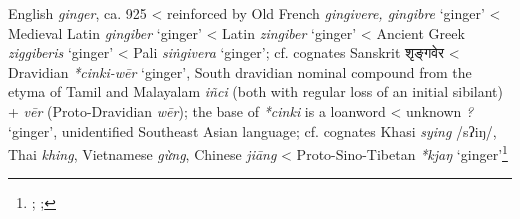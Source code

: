 \begin{etymology}\label{ety:ginger}
English \textit{ginger}, ca. 925
< reinforced by Old French \textit{gingivere, gingibre } `ginger'
< Medieval Latin \textit{gingiber} `ginger'
< Latin \textit{zingiber} `ginger'
< Ancient Greek {} \textit{ziggiberis} `ginger'
< Pali \textit{siṅgivera } `ginger'; cf. cognates Sanskrit शृङ्गवेर 
< Dravidian \textit{*cinki-wēr} `ginger', South dravidian nominal compound  from the etyma of Tamil and Malayalam \textit{iñci} (both with regular loss of an initial sibilant) + \textit{vēr} (Proto-Dravidian \textit{wēr}); the base of \textit{*cinki} is a loanword
< unknown \textit{?} `ginger', unidentified Southeast Asian language; cf. cognates Khasi \textit{sying} /sʔiŋ/, Thai \textit{khing}, Vietnamese \textit{gừng}, Chinese \textit{jiāng}
< Proto-Sino-Tibetan \textit{*kjaŋ} `ginger'\footnote{\textcite{oed, ross_ginger_1952}; \textcite[5]{krishnamurti_dravidian_2003}; }
\end{etymology}